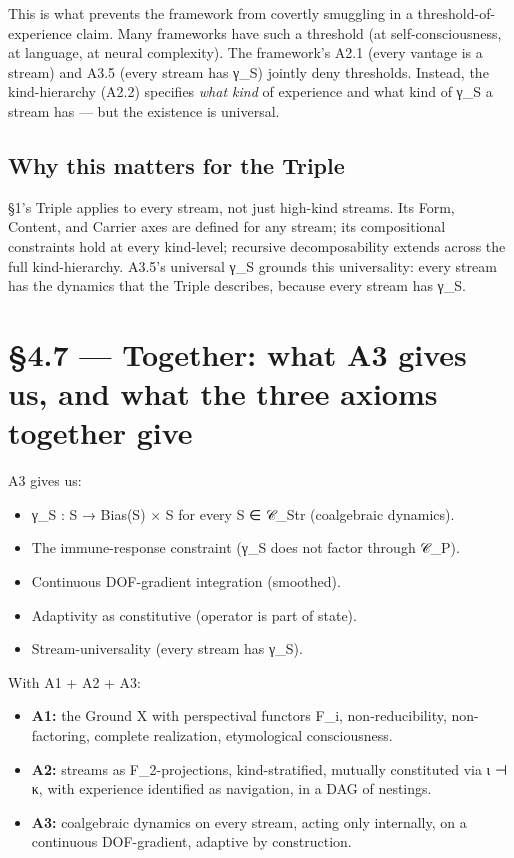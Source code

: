 \documentclass[11pt, openany]{book}
\newcommand{\sectionbreak}{\clearpage}
\begin{document}
This is what prevents the framework from covertly smuggling in a threshold-of-experience claim. Many frameworks have such a threshold (at self-consciousness, at language, at neural complexity). The framework's A2.1 (every vantage is a stream) and A3.5 (every stream has γ\_\allowbreak{}S) jointly deny thresholds. Instead, the kind-hierarchy (A2.2) specifies \textit{what kind} of experience and what kind of γ\_\allowbreak{}S a stream has --- but the existence is universal.

\subsection{Why this matters for the Triple}

§1's Triple applies to every stream, not just high-kind streams. Its Form, Content, and Carrier axes are defined for any stream; its compositional constraints hold at every kind-level; recursive decomposability extends across the full kind-hierarchy. A3.5's universal γ\_\allowbreak{}S grounds this universality: every stream has the dynamics that the Triple describes, because every stream has γ\_\allowbreak{}S.

\sectionbreak

\section{§4.7 --- Together: what A3 gives us, and what the three axioms together give}

A3 gives us:
\begin{itemize}
\item γ\_\allowbreak{}S : S → Bias(S) × S for every S ∈ 𝒞\_\allowbreak{}Str (coalgebraic dynamics).
\item The immune-response constraint (γ\_\allowbreak{}S does not factor through 𝒞\_\allowbreak{}P).
\item Continuous DOF-gradient integration (smoothed).
\item Adaptivity as constitutive (operator is part of state).
\item Stream-universality (every stream has γ\_\allowbreak{}S).
\end{itemize}

With A1 + A2 + A3:
\begin{itemize}
\item \textbf{A1:} the Ground X with perspectival functors F\_\allowbreak{}i, non-reducibility, non-factoring, complete realization, etymological consciousness.
\item \textbf{A2:} streams as F\_\allowbreak{}2-projections, kind-stratified, mutually constituted via ι ⊣ κ, with experience identified as navigation, in a DAG of nestings.
\item \textbf{A3:} coalgebraic dynamics on every stream, acting only internally, on a continuous DOF-gradient, adaptive by construction.
\end{itemize}
\end{document}
